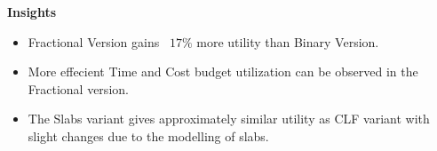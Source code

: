 \noindent \textbf{Insights}
\begin{itemize}
    \item Fractional Version gains ~$17\%$ more utility than Binary Version.
    \item More effecient Time and Cost budget utilization can be observed in the Fractional version.
    \item The Slabs variant gives approximately similar utility as CLF variant with slight changes due to the modelling of slabs.
\end{itemize}

